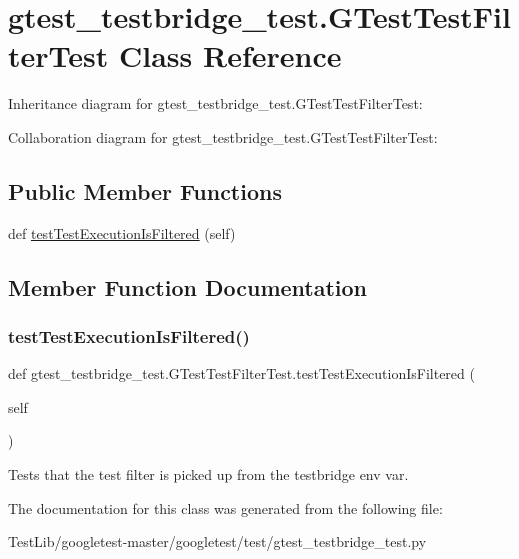 \hypertarget{classgtest__testbridge__test_1_1GTestTestFilterTest}{}\section{gtest\+\_\+testbridge\+\_\+test.\+G\+Test\+Test\+Filter\+Test Class Reference}
\label{classgtest__testbridge__test_1_1GTestTestFilterTest}


Inheritance diagram for gtest\+\_\+testbridge\+\_\+test.\+G\+Test\+Test\+Filter\+Test\+:


Collaboration diagram for gtest\+\_\+testbridge\+\_\+test.\+G\+Test\+Test\+Filter\+Test\+:
\subsection*{Public Member Functions}
\begin{DoxyCompactItemize}
\item 
def \hyperlink{classgtest__testbridge__test_1_1GTestTestFilterTest_af41ae1fea4ec08f5594ad1ae78663d3c}{test\+Test\+Execution\+Is\+Filtered} (self)
\end{DoxyCompactItemize}


\subsection{Member Function Documentation}
\mbox{\label{classgtest__testbridge__test_1_1GTestTestFilterTest_af41ae1fea4ec08f5594ad1ae78663d3c}} 
\subsubsection{\texorpdfstring{test\+Test\+Execution\+Is\+Filtered()}{testTestExecutionIsFiltered()}}
{\footnotesize\ttfamily def gtest\+\_\+testbridge\+\_\+test.\+G\+Test\+Test\+Filter\+Test.\+test\+Test\+Execution\+Is\+Filtered (\begin{DoxyParamCaption}\item[{}]{self }\end{DoxyParamCaption})}

\begin{DoxyVerb}Tests that the test filter is picked up from the testbridge env var.\end{DoxyVerb}
 

The documentation for this class was generated from the following file\+:\begin{DoxyCompactItemize}
\item 
Test\+Lib/googletest-\/master/googletest/test/gtest\+\_\+testbridge\+\_\+test.\+py\end{DoxyCompactItemize}
